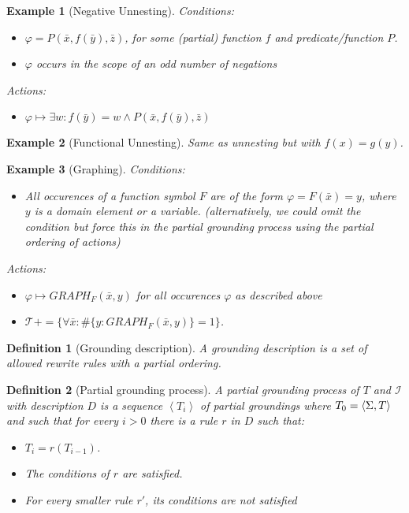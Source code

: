 \documentclass{article}
\newcommand{\I}{\mathcal{I}}
\newcommand{\seq}[1]{\left\langle#1\right\rangle}
\newcommand{\T}{\mathcal{T}}
\newtheorem{definition}{Definition}
\newtheorem{example}{Example}
\begin{document}
\begin{example}[Negative Unnesting]
Conditions:
\begin{itemize}
    \item  $\varphi = P(\bar x, f(\bar y),\bar z)$, for some (partial) function $f$ and predicate/function $P$.
	\item $\varphi$ occurs in the scope of an odd number of negations
\end{itemize}
Actions:
\begin{itemize}
    \item  $\varphi \mapsto \exists w: f(\bar y) = w \wedge P(\bar x, f(\bar y),\bar z)$
\end{itemize}
\end{example}

\begin{example}[Functional Unnesting]
	Same as unnesting but with $f(x)=g(y)$.
\end{example}

\begin{example}[Graphing]
Conditions:
\begin{itemize}
    \item  All occurences of a function symbol $F$ are of the form $\varphi = F(\bar x) = y$, where $y$ is a domain element or a variable. (alternatively, we could omit the condition but force this in the partial grounding process using the partial ordering of actions)
\end{itemize}
Actions:
\begin{itemize}
    \item  $\varphi \mapsto GRAPH_F(\bar x, y)$ for all occurences $\varphi$ as described above
\item $\T += \{\forall \bar x: \#\{y: GRAPH_F(\bar x, y)\} = 1\}$.
\end{itemize}
\end{example}

\begin{definition}[Grounding description]
A grounding description is a set of allowed rewrite rules with a partial ordering.
\end{definition}

\begin{definition}[Partial grounding process]
A \textit{partial grounding process} of $T$ and $\I$ with description $D$ is a sequence $\seq{T_i}$ of partial groundings where $T_0= \seq{\voc,T}$ and such that for every $i>0$ there is a rule $r$ in $D$ such that:
\begin{itemize}
	\item $T_i = r(T_{i-1})$.
	\item The conditions of $r$ are satisfied.
	\item For every smaller rule $r'$, its conditions are  not satisfied
\end{itemize}
\end{definition}
\end{document}
